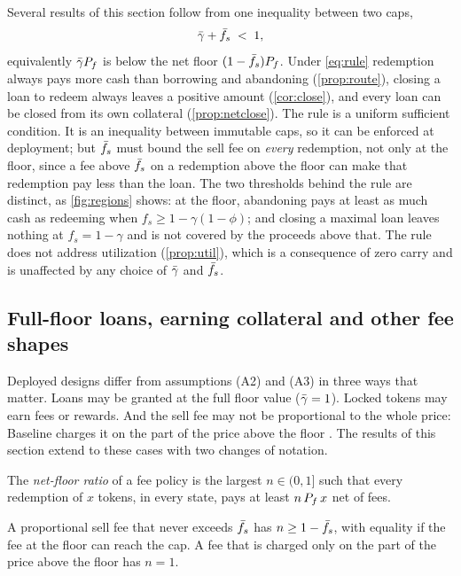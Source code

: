 Several results of this section follow from one inequality between two caps,
\begin{equation}\label{eq:rule}
\bar\gamma+\bar f_s\;<\;1 ,
\end{equation}
equivalently $\bar\gamma P_f$ is below the net floor $(1-\bar f_s)P_f$. Under \eqref{eq:rule} redemption always pays more cash than borrowing and abandoning (\cref{prop:route}), closing a loan to redeem always leaves a positive amount (\cref{cor:close}), and every loan can be closed from its own collateral (\cref{prop:netclose}). The rule is a uniform sufficient condition. It is an inequality between immutable caps, so it can be enforced at deployment; but $\bar f_s$ must bound the sell fee on \emph{every} redemption, not only at the floor, since a fee above $\bar f_s$ on a redemption above the floor can make that redemption pay less than the loan. The two thresholds behind the rule are distinct, as \cref{fig:regions} shows: at the floor, abandoning pays at least as much cash as redeeming when $f_s\ge1-\gamma(1-\phi)$; and closing a maximal loan leaves nothing at $f_s=1-\gamma$ and is not covered by the proceeds above that. The rule does not address utilization (\cref{prop:util}), which is a consequence of zero carry and is unaffected by any choice of $\bar\gamma$ and $\bar f_s$.

\subsection{Full-floor loans, earning collateral and other fee shapes}\label{sec:general}

Deployed designs differ from assumptions (A2) and (A3) in three ways that matter. Loans may be granted at the full floor value ($\bar\gamma=1$). Locked tokens may earn fees or rewards. And the sell fee may not be proportional to the whole price: Baseline charges it on the part of the price above the floor \citep{baselinedocs}. The results of this section extend to these cases with two changes of notation.

\begin{definition}
The \emph{net-floor ratio} of a fee policy is the largest $n\in(0,1]$ such that every redemption of $x$ tokens, in every state, pays at least $n\,P_f\,x$ net of fees.
\end{definition}

A proportional sell fee that never exceeds $\bar f_s$ has $n\ge1-\bar f_s$, with equality if the fee at the floor can reach the cap. A fee that is charged only on the part of the price above the floor has $n=1$.

